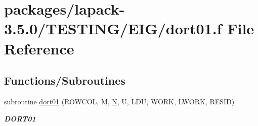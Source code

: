 \hypertarget{dort01_8f}{}\section{packages/lapack-\/3.5.0/\+T\+E\+S\+T\+I\+N\+G/\+E\+I\+G/dort01.f File Reference}
\label{dort01_8f}
\subsection*{Functions/\+Subroutines}
\begin{DoxyCompactItemize}
\item 
subroutine \hyperlink{group__double__eig_ga4d1a5c2792c183c95bcab211a6c8027a}{dort01} (R\+O\+W\+C\+O\+L, M, \hyperlink{polmisc_8c_a0240ac851181b84ac374872dc5434ee4}{N}, U, L\+D\+U, W\+O\+R\+K, L\+W\+O\+R\+K, R\+E\+S\+I\+D)
\begin{DoxyCompactList}\small\item\em {\bfseries D\+O\+R\+T01} \end{DoxyCompactList}\end{DoxyCompactItemize}
